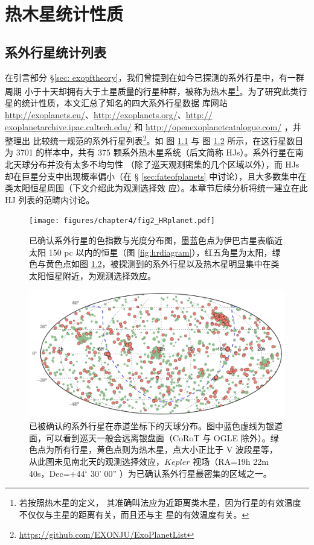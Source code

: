 \chapter{热木星统计性质} \label{chapter:data_stat}

\section{系外行星统计列表}

在引言部分 \S \ref{sec: exopftheory}，我们曾提到在如今已探测的系外行星中，有一群周期
小于十天却拥有大于土星质量的行星种群，被称为热木星\footnote{若按照热木星的定义，
其准确叫法应为近距离类木星，因为行星的有效温度不仅仅与主星的距离有关，而且还与主
星的有效温度有关。}。为了研究此类行星的统计性质，本文汇总了知名的四大系外行星数据
库网站 \url{http://exoplanets.eu/}、\url{http://exoplanets.org/}、\url{http://
exoplanetarchive.ipac.caltech.edu/} 和 \url{http://openexoplanetcatalogue.com/} ，并整理出
比较统一规范的系外行星列表\footnote{\url{https://github.com/EXONJU/ExoPlanetList}}。如
图 \ref{fig:hrplanet} 与 图 \ref{fig:exoskydist} 所示，在这行星数目为 3701 的样本中，共有 
375 颗系外热木星系统（后文简称 HJs）。系外行星在南北天球分布并没有太多不均匀性
（除了巡天观测密集的几个区域以外），而 HJs 却在巨星分支中出现概率偏小（在 \S 
\ref{sec:fateofplanets} 中讨论），且大多数集中在类太阳恒星周围（下文介绍此为观测选择效
应）。本章节后续分析将统一建立在此 HJ 列表的范畴内讨论。

\begin{figure}
\centering
\texttt{[image: figures/chapter4/fig2\_HRplanet.pdf]}
\caption{已确认系外行星的色指数与光度分布图，墨蓝色点为伊巴古星表临近太阳 150 pc 以内的恒星（图 \ref{fig:hrdiagram}），红五角星为太阳，绿色与黄色点如图 \ref{fig:exoskydist}，被探测到的系外行星以及热木星明显集中在类太阳恒星附近，为观测选择效应。}
\label{fig:hrplanet}
\end{figure}


\begin{figure}
\centering
\includegraphics[width=1.0\textwidth]{figures/chapter4/fig1_exodistmollweide.pdf}
\caption{已被确认的系外行星在赤道坐标下的天球分布。图中蓝色虚线为银道面，可以看到巡天一般会远离银盘面（CoRoT 与 OGLE 除外）。绿色点为所有行星，黄色点则为热木星，点大小正比于 V 波段星等，从此图未见南北天的观测选择效应，$Kepler$ 视场（RA=19h 22m 40s，Dec=+44$^\circ$ 30' 00'' ）为已确认系外行星最密集的区域之一。}
\label{fig:exoskydist}
\end{figure}


